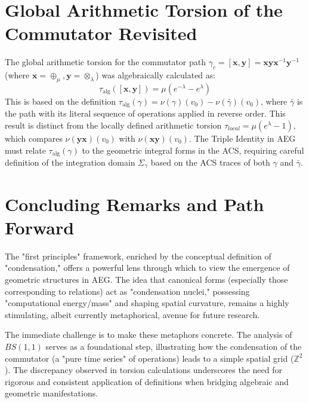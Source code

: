\documentclass[12pt, a4paper]{article}
\theoremstyle{definition}
\begin{document}
\section{Global Arithmetic Torsion of the Commutator Revisited}
The global arithmetic torsion for the commutator path $\gamma_c = [\mathbf{x},\mathbf{y}] = \mathbf{x}\mathbf{y}\mathbf{x}^{-1}\mathbf{y}^{-1}$ (where $\mathbf{x} = \oplus_\mu, \mathbf{y} = \otimes_\lambda$) was algebraically calculated as:
\[ \tau_{\text{alg}}([\mathbf{x},\mathbf{y}]) = \mu (e^{-\lambda} - e^\lambda) \]
This is based on the definition $\tau_{\text{alg}}(\gamma) = \nu(\gamma)(v_0) - \nu(\bar{\gamma})(v_0)$, where $\bar{\gamma}$ is the path with its literal sequence of operations applied in reverse order. This result is distinct from the locally defined arithmetic torsion $\tau_{local} = \mu(e^\lambda - 1)$, which compares $\nu(\mathbf{y}\mathbf{x})(v_0)$ with $\nu(\mathbf{x}\mathbf{y})(v_0)$. The Triple Identity in AEG must relate $\tau_{\text{alg}}(\gamma)$ to the geometric integral forms in the ACS, requiring careful definition of the integration domain $\Sigma_\gamma$ based on the ACS traces of both $\gamma$ and $\bar{\gamma}$.

\section{Concluding Remarks and Path Forward}
The "first principles" framework, enriched by the conceptual definition of "condensation," offers a powerful lens through which to view the emergence of geometric structures in AEG. The idea that canonical forms (especially those corresponding to relations) act as "condensation nuclei," possessing "computational energy/mass" and shaping spatial curvature, remains a highly stimulating, albeit currently metaphorical, avenue for future research.

The immediate challenge is to make these metaphors concrete. The analysis of $BS(1,1)$ serves as a foundational step, illustrating how the condensation of the commutator (a "pure time series" of operations) leads to a simple spatial grid ($\mathbb{Z}^2$). The discrepancy observed in torsion calculations underscores the need for rigorous and consistent application of definitions when bridging algebraic and geometric manifestations.
\end{document}
